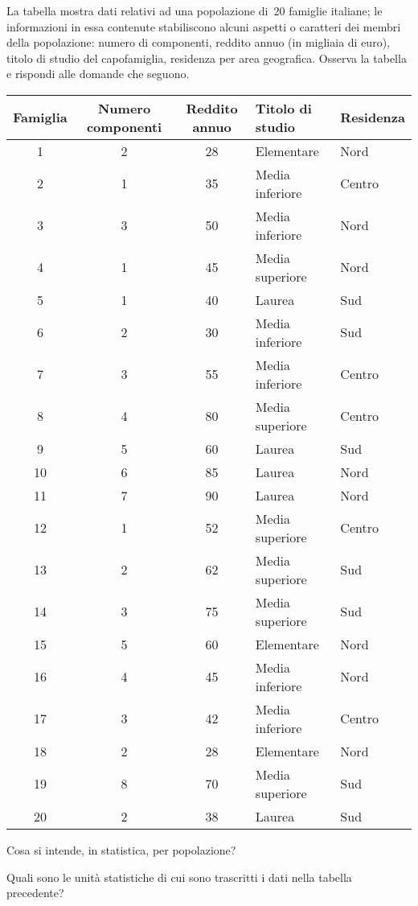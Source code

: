 \begin{esercizio}
\label{ese:A.9}
La tabella mostra dati relativi ad una popolazione di~20 famiglie italiane; le informazioni in essa contenute stabiliscono alcuni aspetti o caratteri
dei membri della popolazione: numero di componenti, reddito annuo (in migliaia di euro), titolo di studio del capofamiglia, residenza per area geografica.
Osserva la tabella e rispondi alle domande che seguono.
\begin{center}
 \begin{tabular}{cccll}
\toprule
Famiglia & Numero componenti & Reddito annuo & Titolo di studio & Residenza\\
\midrule
1 & 2 & 28 & Elementare & Nord \\
2 & 1 & 35 & Media inferiore & Centro \\
3 & 3 & 50 & Media inferiore & Nord \\
4 & 1 & 45 & Media superiore & Nord \\
5 & 1 & 40 & Laurea & Sud \\
6 & 2 & 30 & Media inferiore & Sud \\
7 & 3 & 55 & Media inferiore & Centro \\
8 & 4 & 80 & Media superiore & Centro \\
9 & 5 & 60 & Laurea & Sud \\
10 & 6 & 85 & Laurea & Nord \\
11 & 7 & 90 & Laurea & Nord \\
12 & 1 & 52 & Media superiore & Centro \\
13 & 2 & 62 & Media superiore & Sud \\
14 & 3 & 75 & Media superiore & Sud \\
15 & 5 & 60 & Elementare & Nord\\
16 & 4 & 45 & Media inferiore & Nord \\
17 & 3 & 42 & Media inferiore & Centro \\
18 & 2 & 28 & Elementare & Nord \\
19 & 8 & 70 & Media superiore & Sud \\
20 & 2 & 38 & Laurea & Sud \\
\bottomrule
\end{tabular}
\end{center}
\begin{itemize*}
\item Cosa si intende, in statistica, per popolazione?
\item Quali sono le unità statistiche di cui sono trascritti i dati nella tabella precedente?

\end{itemize*}
\end{esercizio}

